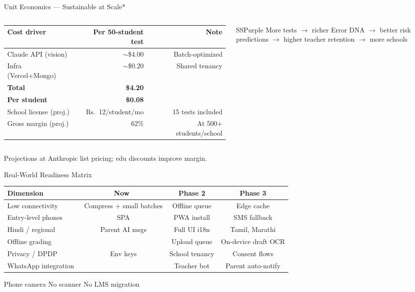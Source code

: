 \documentclass[aspectratio=169,10pt]{beamer}
\newcommand{\cmark}{\textcolor{SSGreen}{\ding{51}}}
\newcommand{\xmark}{\textcolor{SSRed}{\ding{55}}}
\newcommand{\pmark}{\textcolor{SSGold}{\ding{117}}}
\newcommand{\badge}[2]{%
  \tikz[baseline=(b.base)]{
    \node[fill=#1, text=white, rounded corners=3pt, inner xsep=6pt, inner ysep=2pt,
          font=\scriptsize\bfseries] (b) {#2};
  }%
}
\begin{document}
\begin{frame}{Unit Economics — Sustainable at Scale*}
  \begin{columns}
    \footnotesize
    \begin{tabular}{@{}lrr@{}}
      \toprule
      \textbf{Cost driver} & \textbf{Per 50-student test} & \textbf{Note} \\
      \midrule
      Claude API (vision) & $\sim$\$4.00 & Batch-optimized \\
      Infra (Vercel+Mongo) & $\sim$\$0.20 & Shared tenancy \\
      \textbf{Total} & \textbf{\$4.20} & \\
      \textbf{Per student} & \textbf{\$0.08} & \\
      School license (proj.) & Rs.~12/student/mo & 15 tests included \\
      Gross margin (proj.) & 62\% & At 500+ students/school \\
      \bottomrule
    \end{tabular}

    \begin{callout}[title={Flywheel}]{SSPurple}
      \footnotesize
      More tests $\rightarrow$ richer Error DNA $\rightarrow$ better risk predictions $\rightarrow$ higher teacher retention $\rightarrow$ more schools
    \end{callout}
  \end{columns}
  \tiny *Projections at Anthropic list pricing; edu discounts improve margin.
\end{frame}

\begin{frame}{Real-World Readiness Matrix}
  \footnotesize
  \renewcommand{\arraystretch}{1.3}
  \begin{tabular}{@{}lccc@{}}
    \toprule
    \textbf{Dimension} & \textbf{Now} & \textbf{Phase 2} & \textbf{Phase 3} \\
    \midrule
    Low connectivity & \pmark\ Compress + small batches & Offline queue & Edge cache \\
    Entry-level phones & \cmark\ SPA & PWA install & SMS fallback \\
    Hindi / regional & \pmark\ Parent AI msgs & Full UI i18n & Tamil, Marathi \\
    Offline grading & \xmark & Upload queue & On-device draft OCR \\
    Privacy / DPDP & \pmark\ Env keys & School tenancy & Consent flows \\
    WhatsApp integration & \xmark & Teacher bot & Parent auto-notify \\
    \bottomrule
  \end{tabular}

  \vspace{0.2cm}
  \badge{SSGreen}{India-first} Phone camera \textbullet{} No scanner \textbullet{} No LMS migration
\end{frame}
\end{document}
